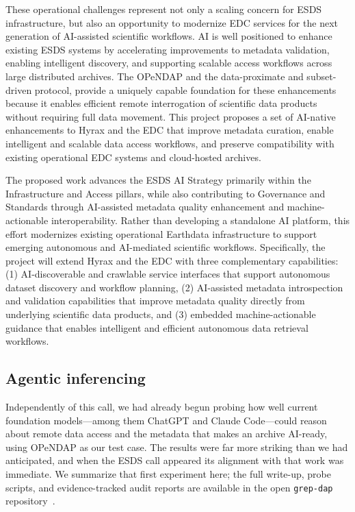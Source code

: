\documentclass[11pt]{article}
\begin{document}
These operational challenges represent not only a scaling concern for \ac{ESDS} infrastructure, but also an opportunity to modernize \ac{EDC} services for the next generation of \ac{AI}-assisted scientific workflows. \ac{AI} is well positioned to enhance existing \ac{ESDS} systems by accelerating improvements to metadata validation, enabling intelligent discovery, and supporting scalable access workflows across large distributed archives. The \ac{OPeNDAP} and the data-proximate and subset-driven protocol, provide a uniquely capable foundation for these enhancements because it enables efficient remote interrogation of scientific data products without requiring full data movement. This project proposes a set of \ac{AI}-native enhancements to Hyrax and the \ac{EDC} that improve metadata curation, enable intelligent and scalable data access workflows, and preserve compatibility with existing operational \ac{EDC} systems and cloud-hosted archives.

The proposed work advances the \ac{ESDS} \ac{AI} Strategy primarily within the Infrastructure and Access pillars, while also contributing to Governance and Standards through \ac{AI}-assisted metadata quality enhancement and machine-actionable interoperability. Rather than developing a standalone \ac{AI} platform, this effort modernizes existing operational Earthdata infrastructure to support emerging autonomous and \ac{AI}-mediated scientific workflows. Specifically, the project will extend Hyrax and the \ac{EDC} with three complementary capabilities: (1) \ac{AI}-discoverable and crawlable service interfaces that support autonomous dataset discovery and workflow planning, (2) \ac{AI}-assisted metadata introspection and validation capabilities that improve metadata quality directly from underlying scientific data products, and (3) embedded machine-actionable guidance that enables intelligent and efficient autonomous data retrieval workflows.

\subsection{Agentic inferencing}
\label{section-1.1}

Independently of this call, we had already begun probing how well current foundation models---among them ChatGPT and Claude Code---could reason about remote data access and the metadata that makes an archive \ac{AI}-ready, using \ac{OPeNDAP} as our test case. The results were far more striking than we had anticipated, and when the \ac{ESDS} call appeared its alignment with that work was immediate. We summarize that first experiment here; the full write-up, probe scripts, and evidence-tracked audit reports are available in the open \texttt{grep-dap} repository~\cite{grepdap}.
\end{document}
